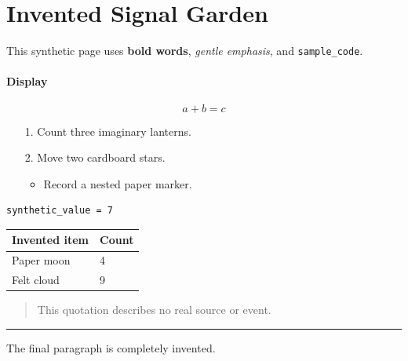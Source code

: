 \part*{\texorpdfstring{Invented Signal Garden}{Invented Signal Garden}}


\begingroup
\setlength{\emergencystretch}{12em}
This synthetic page uses \textbf{bold words}, \emph{gentle emphasis}, and \texttt{sample\_code}.
\par
\endgroup


\begin{keeptogether}
\subsection*{\texorpdfstring{Display}{Display}}


\[
a + b = c
\]
\end{keeptogether}

\begin{enumerate}
\item[1.] Count three imaginary lanterns.
\item[2.] Move two cardboard stars.
\begin{itemize}
\item Record a nested paper marker.

\end{itemize}
\end{enumerate}
\begin{samepage}
\begin{Verbatim}[breaklines=true,breakanywhere=true]
synthetic_value = 7
\end{Verbatim}
\end{samepage}

\begin{center}
\renewcommand{\arraystretch}{1.15}
\setlength{\tabcolsep}{4pt}
\begin{tabularx}{\linewidth}{@{}YY@{}}
\hline
\textbf{Invented item} & \textbf{Count} \\
\hline
Paper moon & 4 \\
Felt cloud & 9 \\
\hline
\end{tabularx}
\end{center}


\begin{quote}
This quotation describes no real source or event.
\end{quote}


\medskip\hrule\medskip


\nopagebreak[4]
The final paragraph is completely invented.

